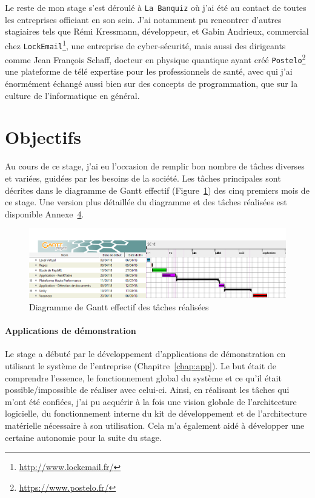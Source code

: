 Le reste de mon stage s'est déroulé à \texttt{La Banquiz} où j'ai été au contact de toutes les entreprises officiant en son sein. J'ai notamment pu rencontrer d'autres stagiaires tels que Rémi Kressmann, développeur, et Gabin Andrieux, commercial chez \texttt{LockEmail}\footnote{\href{http://www.lockemail.fr/}{http://www.lockemail.fr/}}, une entreprise de cyber-sécurité, mais aussi des dirigeants comme Jean François Schaff, docteur en physique quantique ayant créé  \texttt{Postelo}\footnote{\href{https://www.postelo.fr/}{https://www.postelo.fr/}} une plateforme de télé expertise pour les professionnels de santé, avec qui j'ai énormément échangé aussi bien sur des concepts de programmation, que sur la culture de l'informatique en général.

\section{Objectifs}

Au cours de ce stage, j'ai eu l'occasion de remplir bon nombre de tâches diverses et variées, guidées par les besoins de la société. Les tâches principales sont décrites dans le diagramme de Gantt effectif (Figure~\ref{fig:gantshort}) des cinq premiers mois de ce stage. Une version plus détaillée du diagramme et des tâches réalisées est disponible Annexe~\hyperref[annexe:gantt]{4}.

\begin{figure}[H]
\includegraphics[width=\linewidth]{images/GanttMemoire}
\caption{Diagramme de Gantt effectif des tâches réalisées}
\label{fig:gantshort}
\end{figure}

\paragraph{Applications de démonstration} Le stage a débuté par le développement d'applications de démonstration en utilisant le système de l'entreprise (Chapitre~\ref{chap:app}). Le but était de comprendre l'essence, le fonctionnement global du système et ce qu'il était possible/impossible de réaliser avec celui-ci. Ainsi, en réalisant les tâches qui m'ont été confiées, j'ai pu acquérir à la fois une vision globale de l'architecture logicielle, du fonctionnement interne du kit de développement et de l'architecture matérielle nécessaire à son utilisation. Cela m'a également aidé à développer une certaine autonomie pour la suite du stage.

